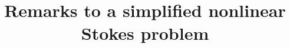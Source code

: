 \documentclass[12pt]{article}
\numberwithin{equation}{section}
\begin{document}
	
	\def\sm{\smallskip}
	\def\bi{\bigskip}
	\def\me{\medskip}
	\def\ce{\centerline}
	
	
	
	\def\no{\noindent}
	\def\bi{\bigskip}
	\def\sm{\smallskip}
	\def\me{\medskip}
	
	\newcommand{\alertg}[1]{{\color{green}#1}}
	\newcommand{\alert}[1]{{\color{red}#1}}
	\newcommand{\alertb}[1]{{\color{blue}#1}}
	
	
	
	\title{Remarks to a simplified nonlinear Stokes problem}
	
	\maketitle

% 
%	
%
%	
%	
	
\end{document}
